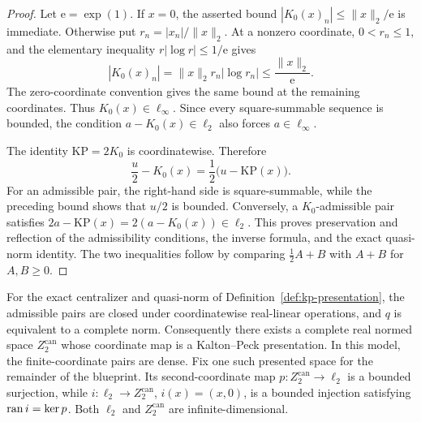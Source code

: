 \begin{proof}
Let $\mathrm e=\exp(1)$.  If $x=0$, the asserted bound
$|K_0(x)_n|\leq\|x\|_2/\mathrm e$ is immediate.  Otherwise put
$r_n=|x_n|/\|x\|_2$.  At a nonzero coordinate, $0<r_n\leq1$, and the elementary inequality
$r|\log r|\leq1/\mathrm e$ gives
\[
  |K_0(x)_n|=\|x\|_2r_n|\log r_n|\leq\frac{\|x\|_2}{\mathrm e}.
\]
The zero-coordinate convention gives the same bound at the remaining coordinates.  Thus
$K_0(x)\in\ell_\infty$.  Since every square-summable sequence is bounded, the condition
$a-K_0(x)\in\ell_2$ also forces $a\in\ell_\infty$.

The identity $\mathrm{KP}=2K_0$ is coordinatewise.  Therefore
\[
  \frac u2-K_0(x)=\frac12\bigl(u-\mathrm{KP}(x)\bigr).
\]
For an admissible pair, the right-hand side is square-summable, while the preceding bound shows that
$u/2$ is bounded.  Conversely, a $K_0$-admissible pair satisfies
$2a-\mathrm{KP}(x)=2(a-K_0(x))\in\ell_2$.  This proves preservation and reflection of the
admissibility conditions, the inverse formula, and the exact quasi-norm identity.  The two
inequalities follow by comparing $\frac12A+B$ with $A+B$ for $A,B\geq0$.
\end{proof}

\begin{theorem}\label{thm:kp-canonical-banach}
For the exact centralizer and quasi-norm of Definition~\ref{def:kp-presentation}, the admissible
pairs are closed under coordinatewise real-linear operations, and $q$ is equivalent to a complete
norm.  Consequently there exists a complete real normed space $Z_2^{\mathrm{can}}$ whose coordinate
map is a Kalton--Peck presentation.  In this model, the finite-coordinate pairs are dense.  Fix one
such presented space for the remainder of the blueprint.  Its second-coordinate map
$p:Z_2^{\mathrm{can}}\to\ell_2$ is a bounded surjection, while
$i:\ell_2\to Z_2^{\mathrm{can}}$, $i(x)=(x,0)$, is a bounded injection satisfying
$\operatorname{ran} i=\ker p$.  Both $\ell_2$ and $Z_2^{\mathrm{can}}$ are infinite-dimensional.
\leanok
\end{theorem}

